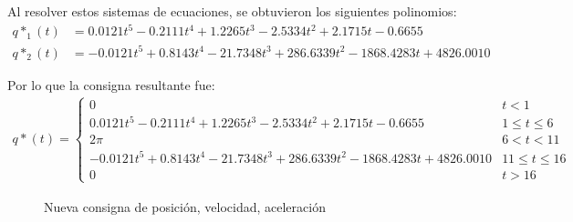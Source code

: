 \documentclass[a4paper, 10pt, onecolumn,journal]{ieeeconf}
\begin{document}
Al resolver estos sistemas de ecuaciones, se obtuvieron los siguientes polinomios:
\begin{align}
	q*_1(t) &= 0.0121t^5 - 0.2111t^4 + 1.2265t^3 - 2.5334t^2 + 2.1715t - 0.6655\\
	q*_2(t) &= -0.0121t^5 + 0.8143t^4 - 21.7348t^3 + 286.6339t^2 - 1868.4283t + 4826.0010
\end{align}
 
Por lo que la consigna resultante fue:
\begin{align}
	q*(t) =
	\begin{cases}
		0  &  t<1 \\
		 0.0121t^5 - 0.2111t^4 + 1.2265t^3 - 2.5334t^2 + 2.1715t - 0.6655  &  1 \leq t \leq 6 \\
		2\pi  &  6 < t < 11 \\
		-0.0121t^5 + 0.8143t^4 - 21.7348t^3 + 286.6339t^2 - 1868.4283t + 4826.0010  &  11 \leq t \leq 16 \\
		0  &  t>16
	\end{cases}
\end{align}

\begin{figure}[H]
	\centering
	\begin{adjustbox}{max width=\columnwidth}
	\end{adjustbox}
	\caption{Nueva consigna de posición, velocidad, aceleración}
	\label{Nueva consigna de posición, velocidad, aceleración}
\end{figure}
\end{document}
